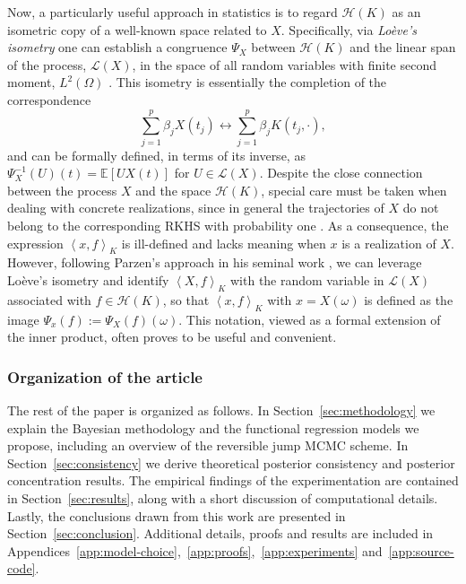 \documentclass{article}
\numberwithin{equation}{section}
\theoremstyle{plain}
\theoremstyle{definition}
\newcommand{\E}{\mathbb{E}}
\newcommand{\Hcal}{\mathcal{H}}
\newcommand\dotprod[2]{\left\langle#1,#2\right\rangle}
\begin{document}
Now, a particularly useful approach in statistics is to regard \(\Hcal(K)\) as an isometric copy of a well-known space related to \(X\). Specifically, via \textit{Loève's isometry} \citep{loeve1948fonctions} one can establish a congruence \(\Psi_X\) between \(\Hcal(K)\) and the linear span of the process, \(\mathcal L(X)\), in the space of all random variables with finite second moment, \(L^2(\Omega)\) \citep[see Lemma 1.1 in][]{lukic2001stochastic}. This isometry is essentially the completion of the correspondence
\begin{equation*}
  \sum_{j=1}^p \beta_j X(t_j) \longleftrightarrow \sum_{j=1}^p \beta_j K(t_j, \cdot),
\end{equation*}
and can be formally defined, in terms of its inverse, as \(\Psi^{-1}_X(U)(t) = \E[U X(t)]\) for \(U \in \mathcal L(X)\).
Despite the close connection between the process \(X\) and the space \(\Hcal(K)\), special care must be taken when dealing with concrete realizations, since in general the trajectories of \(X\) do not belong to the corresponding RKHS with probability one \citep[][Corollary~7.1]{lukic2001stochastic}. As a consequence, the expression \(\dotprod{x}{f}_K\) is ill-defined and lacks meaning when \(x\) is a realization of \(X\). However, following Parzen's approach in his seminal work \citep[][Theorem~4E]{parzen1961approach}, we can leverage Loève's isometry and identify \(\dotprod{X}{f}_K\) with the random variable in \(\mathcal L(X)\) associated with \(f\in \Hcal(K)\), so that \(\dotprod{x}{f}_K \) with \(x=X(\omega)\) is defined as the image \(\Psi_x(f) := \Psi_X(f)(\omega)\). This notation, viewed as a formal extension of the inner product, often proves to be useful and convenient.

\subsubsection*{Organization of the article}

The rest of the paper is organized as follows. In Section~\ref{sec:methodology} we explain the Bayesian methodology and the functional regression models we propose, including an overview of the reversible jump MCMC scheme. In Section~\ref{sec:consistency} we derive theoretical posterior consistency and posterior concentration results. The empirical findings of the experimentation are contained in Section~\ref{sec:results}, along with a short discussion of computational details. Lastly, the conclusions drawn from this work are presented in Section~\ref{sec:conclusion}. Additional details, proofs and results are included in Appendices~\ref{app:model-choice},~\ref{app:proofs},~\ref{app:experiments} and~\ref{app:source-code}.
\end{document}
